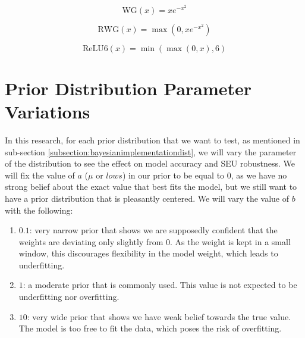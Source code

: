 \documentclass[ %
                    author={Revalda Putawara},
                supervisor={Dr. James Pope},
                    degree={MSc},
                     title={Robustness of Bayesian Neural Networks Design Choices Against Weight and Bias Perturbation Induced by Single Event Upsets (SEUs)},
                      type={},
                      year={2025}]{dissertation}
\begin{document}

\noindent
\begin{minipage}{0.48\linewidth}
\begin{equation}
\text{WG}(x) = x e^{-x^{2}}
\label{eq:wg}
\end{equation}
\end{minipage}\hfill
\begin{minipage}{0.48\linewidth}
\begin{equation}
\text{RWG}(x) = \max(0, x e^{-x^{2}})
\label{eq:rwg}
\end{equation}
\end{minipage}

\noindent
\begin{minipage}{0.48\linewidth}
\begin{equation}
\text{ReLU6}(x) = \min(\max(0, x), 6)
\label{eq:relu6}
\end{equation}
\end{minipage}\hfill
\begin{minipage}{0.48\linewidth}
\end{minipage}


\section{Prior Distribution Parameter Variations}

In this research, for each prior distribution that we want to test, as mentioned in sub-section \ref{subsection:bayesianimplementationdist}, we will vary the parameter of the distribution to see the effect on model accuracy and SEU robustness. We will fix the value of $a$ ($\mu$ or $lows$) in our prior to be equal to 0, as we have no strong belief about the exact value that best fits the model, but we still want to have a prior distribution that is pleasantly centered. We will vary the value of $b$ with the following:
\begin{enumerate}[noitemsep, topsep=0pt]
    \item $0.1$: very narrow prior that shows we are supposedly confident that the weights are deviating only slightly from 0. As the weight is kept in a small window, this discourages flexibility in the model weight, which leads to underfitting.
    \item $1$: a moderate prior that is commonly used. This value is not expected to be underfitting nor overfitting.
    \item $10$: very wide prior that shows we have weak belief towards the true value. The model is too free to fit the data, which poses the risk of overfitting.
\end{enumerate}
\end{document}
